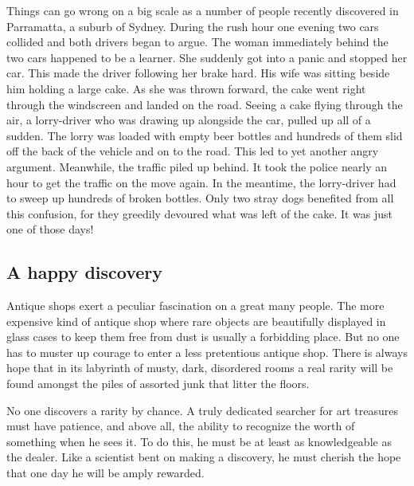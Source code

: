 \documentclass[11pt]{article}
\begin{document}
Things can go wrong on a big scale as a number of people recently discovered in Parramatta, a suburb of Sydney. During the rush hour one evening two cars collided and both drivers began to argue. The woman immediately behind the two cars happened to be a learner. She suddenly got into a panic and stopped her car. This made the driver following her brake hard. His wife was sitting beside him holding a large cake. As she was thrown forward, the cake went right through the windscreen and landed on the road. Seeing a cake flying through the air, a lorry-driver who was drawing up alongside the car, pulled up all of a sudden. The lorry was loaded with empty beer bottles and hundreds of them slid off the back of the vehicle and on to the road. This led to yet another angry argument. Meanwhile, the traffic piled up behind. It took the police nearly an hour to get the traffic on the move again. In the meantime, the lorry-driver had to sweep up hundreds of broken bottles. Only two stray dogs benefited from all this confusion, for they greedily devoured what was left of the cake. It was just one of those days!
\subsection{A happy discovery}
\label{sec-1-34}

Antique shops exert a peculiar fascination on a great many people. The more expensive kind of antique shop where rare objects are beautifully displayed in glass cases to keep them free from dust is usually a forbidding place. But no one has to muster up courage to enter a less pretentious antique shop. There is always hope that in its labyrinth of musty, dark, disordered rooms a real rarity will be found amongst the piles of assorted junk that litter the floors.

No one discovers a rarity by chance. A truly dedicated searcher for art treasures must have patience, and above all, the ability to recognize the worth of something when he sees it. To do this, he must be at least as knowledgeable as the dealer. Like a scientist bent on making a discovery, he must cherish the hope that one day he will be amply rewarded. 
\end{document}
